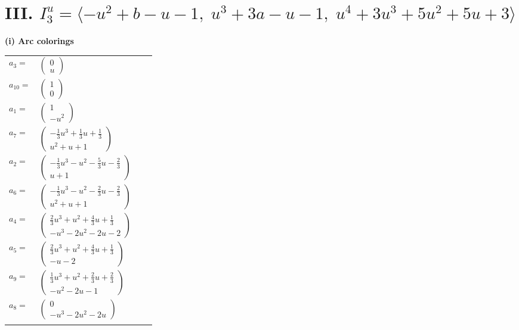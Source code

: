 \documentclass[1p]{elsarticle_modified}
\theoremstyle{definition}
\begin{document}
\centering \section*{III. $I^u_{3}= \langle - u^2+b- u-1,\;u^3+3 a- u-1,\;u^4+3 u^3+5 u^2+5 u+3 \rangle$}
\flushleft \textbf{(i) Arc colorings}\\
\begin{tabular}{m{7pt} m{180pt} m{7pt} m{180pt} }
\flushright $a_{3}=$&$\begin{pmatrix}0\\u\end{pmatrix}$ \\
\flushright $a_{10}=$&$\begin{pmatrix}1\\0\end{pmatrix}$ \\
\flushright $a_{1}=$&$\begin{pmatrix}1\\- u^2\end{pmatrix}$ \\
\flushright $a_{7}=$&$\begin{pmatrix}-\frac{1}{3} u^3+\frac{1}{3} u+\frac{1}{3}\\u^2+u+1\end{pmatrix}$ \\
\flushright $a_{2}=$&$\begin{pmatrix}-\frac{1}{3} u^3- u^2-\frac{5}{3} u-\frac{2}{3}\\u+1\end{pmatrix}$ \\
\flushright $a_{6}=$&$\begin{pmatrix}-\frac{1}{3} u^3- u^2-\frac{2}{3} u-\frac{2}{3}\\u^2+u+1\end{pmatrix}$ \\
\flushright $a_{4}=$&$\begin{pmatrix}\frac{2}{3} u^3+u^2+\frac{4}{3} u+\frac{1}{3}\\- u^3-2 u^2-2 u-2\end{pmatrix}$ \\
\flushright $a_{5}=$&$\begin{pmatrix}\frac{2}{3} u^3+u^2+\frac{4}{3} u+\frac{1}{3}\\- u-2\end{pmatrix}$ \\
\flushright $a_{9}=$&$\begin{pmatrix}\frac{1}{3} u^3+u^2+\frac{2}{3} u+\frac{2}{3}\\- u^2-2 u-1\end{pmatrix}$ \\
\flushright $a_{8}=$&$\begin{pmatrix}0\\- u^3-2 u^2-2 u\end{pmatrix}$\\&\end{tabular}
\end{document}
